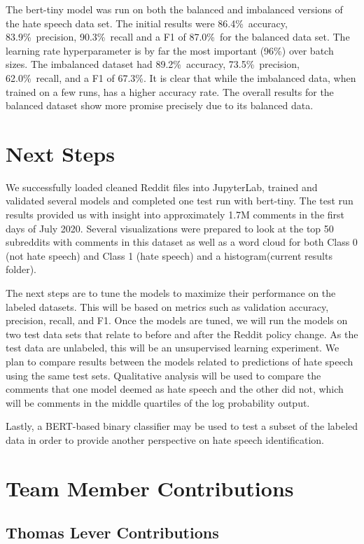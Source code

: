 \documentclass[conference]{IEEEtran}
\begin{document}
The bert-tiny model was run on both the balanced and imbalanced versions of the hate speech data set. The initial results were 86.4\%\ accuracy, 83.9\%\ precision, 90.3\%\ recall and a F1 of 87.0\%\ for the balanced data set. The learning rate hyperparameter is by far the most important (96\%) over batch sizes. The imbalanced dataset had 89.2\%\ accuracy, 73.5\%\ precision, 62.0\%\ recall, and a F1 of 67.3\%\cite{b24}. It is clear that while the imbalanced data, when trained on a few runs, has a higher accuracy rate. The overall results for the balanced dataset show more promise precisely due to its balanced data. 

\section{Next Steps}
We successfully loaded cleaned Reddit files into JupyterLab, trained and validated several models and completed one test run with bert-tiny. The test run results provided us with insight into approximately 1.7M comments in the first days of July 2020. Several visualizations were prepared to look at the top 50 subreddits with comments in this dataset as well as a word cloud for both Class 0 (not hate speech) and Class 1 (hate speech) and a histogram\cite{b24}(current results folder). 

The next steps are to tune the models to maximize their performance on the labeled datasets. This will be based on metrics such as validation accuracy, precision, recall, and F1. Once the models are tuned, we will run the models on two test data sets that relate to before and after the Reddit policy change. As the test data are unlabeled, this will be an unsupervised learning experiment. We plan to compare results between the models related to predictions of hate speech using the same test sets. Qualitative analysis will be used to compare the comments that one model deemed as hate speech and the other did not, which will be comments in the middle quartiles of the log probability output.

Lastly, a BERT-based binary classifier may be used to test a subset of the labeled data in order to provide another perspective on hate speech identification. 

\section{Team Member Contributions}

\subsection{Thomas Lever Contributions}
\end{document}
